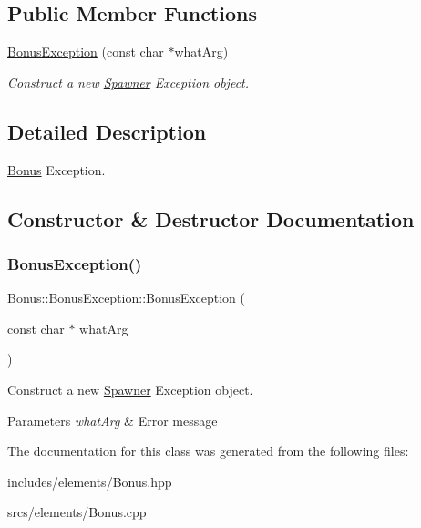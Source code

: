\subsection*{Public Member Functions}
\begin{DoxyCompactItemize}
\item 
\hyperlink{class_bonus_1_1_bonus_exception_a82c9d131ac633d63e295f58f20a149e4}{Bonus\+Exception} (const char $\ast$what\+Arg)
\begin{DoxyCompactList}\small\item\em Construct a new \hyperlink{class_spawner}{Spawner} Exception object. \end{DoxyCompactList}\end{DoxyCompactItemize}


\subsection{Detailed Description}
\hyperlink{class_bonus}{Bonus} Exception. 

\subsection{Constructor \& Destructor Documentation}
\mbox{\label{class_bonus_1_1_bonus_exception_a82c9d131ac633d63e295f58f20a149e4}} 
\subsubsection{\texorpdfstring{Bonus\+Exception()}{BonusException()}}
{\footnotesize\ttfamily Bonus\+::\+Bonus\+Exception\+::\+Bonus\+Exception (\begin{DoxyParamCaption}\item[{const char $\ast$}]{what\+Arg }\end{DoxyParamCaption})\hspace{0.3cm}{\ttfamily [explicit]}}



Construct a new \hyperlink{class_spawner}{Spawner} Exception object. 


\begin{DoxyParams}{Parameters}
{\em what\+Arg} & Error message \\
\hline
\end{DoxyParams}


The documentation for this class was generated from the following files\+:\begin{DoxyCompactItemize}
\item 
includes/elements/Bonus.\+hpp\item 
srcs/elements/Bonus.\+cpp\end{DoxyCompactItemize}
